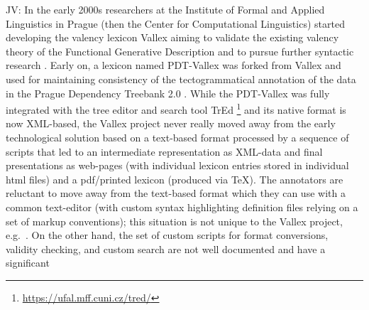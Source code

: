 \documentclass[10pt, a4paper]{article}
\newcommand{\av}[1]{{\color{ansa} AV: #1}}
\newcommand{\jv}[1]{{\color{svlinks} JV: #1}}
\begin{document}
\jv{
In the early 2000s researchers at the Institute of Formal and Applied Linguistics in Prague
(then the Center for Computational Linguistics) started developing the valency lexicon Vallex aiming to
validate the existing valency theory of the Functional Generative Description \cite{Sgall:1986} and to pursue
further syntactic research \cite{LopatkovaEtAl02tektogramaticky}.
Early on, a lexicon named PDT-Vallex was forked from Vallex and used for
maintaining consistency of the tectogrammatical annotation of the data in the
Prague Dependency Treebank 2.0 \cite{PDT2.0,HajicHonetschlager03annotation}.
While the PDT-Vallex was fully integrated with the tree editor and search tool TrEd%
\footnote{\url{https://ufal.mff.cuni.cz/tred/}}
\cite{PajasStepanek08recent}
and its native format is now XML-based,
the Vallex project never really moved away from the early technological solution based on a text-based format
processed by a sequence of scripts that led to an intermediate representation as XML-data
\cite{Zabokrtsky05valency}
and final presentations as web-pages (with individual lexicon entries stored in individual html files)
and a pdf/printed lexicon (produced via TeX).
The annotators are reluctant to move away from the text-based format which they can use with a common text-editor
(with custom syntax highlighting definition files relying on a set of markup conventions);
this situation is not unique to the Vallex project, e.g.\ \cite{Benko19LexiCorp}.
On the other hand, the set of custom scripts for format conversions,
validity checking, and custom search are not well documented and have a significant
}



\end{document}
